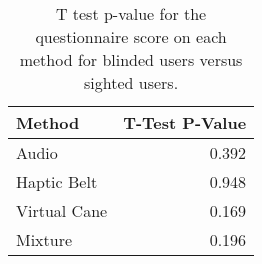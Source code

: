 
\begin{table}[!htb]
\centering
\caption{T test p-value for the questionnaire score on each method for blinded users versus sighted users.}
\label{tab:ttest_questionnaires}
\begin{tabular}{lr}
\toprule
      Method &  T-Test P-Value \\
\midrule
       Audio &           0.392 \\
 Haptic Belt &           0.948 \\
Virtual Cane &           0.169 \\
     Mixture &           0.196 \\
\bottomrule
\end{tabular}
\end{table}

